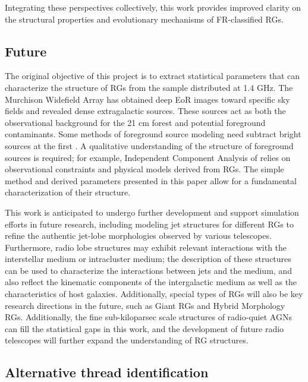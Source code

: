 \documentclass{aa}
\begin{document}
Integrating these perspectives collectively, this work provides improved clarity on the structural properties and evolutionary mechanisms of FR-classified RGs.




\subsection{Future}\label{sec:Future}

The original objective of this project is to extract statistical parameters that can characterize the structure of RGs from the sample distributed at 1.4 GHz. 
The Murchison Widefield Array has obtained deep EoR images toward specific sky fields \citep{offringa_parametrizing_2016} and revealed dense extragalactic sources. These sources act as both the observational background for the 21 cm forest and potential foreground contaminants.
Some methods of foreground source modeling need subtract bright sources at the first \citep{di_matteo_radio_2002,di_matteo_21-cm_2004}.  
A qualitative understanding of the structure of foreground sources is required; for example, Independent Component Analysis of \cite{chapman_foreground_2012} relies on observational constraints and physical models derived from RGs. The simple method and derived parameters presented in this paper allow for a fundamental characterization of their structure.

This work is anticipated to undergo further development and support simulation efforts in future research, including modeling jet structures for different RGs to refine the authentic jet-lobe morphologies observed by various telescopes. Furthermore, radio lobe structures may exhibit relevant interactions with the interstellar medium or intracluster medium; the description of these structures can be used to characterize the interactions between jets and the medium, and also reflect the kinematic components of the intergalactic medium as well as the characteristics of host galaxies. Additionally, special types of RGs will also be key research directions in the future, such as Giant RGs and Hybrid Morphology RGs.
Additionally, the fine sub-kiloparsec scale structures of radio-quiet AGNs \citep[e.g., those detected in J0802+4643][]{vardoulaki_fr-type_2021} can fill the statistical gaps in this work, and the development of future radio telescopes will further expand the understanding of RG structures.





% 
% 
% 
\begin{appendix}
\section{Alternative thread identification}\label{app:Alt} 




\end{appendix}
\end{document}
